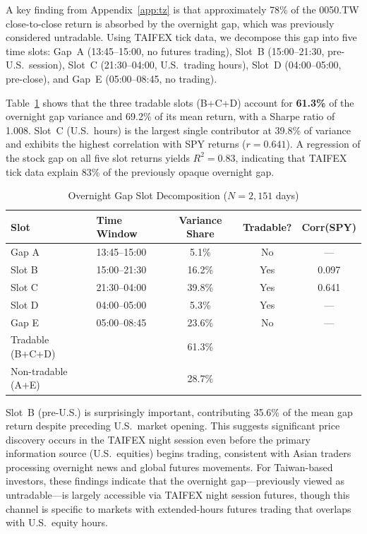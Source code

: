 A key finding from Appendix~\ref{app:tz} is that approximately 78\% of the 0050.TW close-to-close return is absorbed by the overnight gap, which was previously considered untradable. Using TAIFEX tick data, we decompose this gap into five time slots: Gap~A (13:45--15:00, no futures trading), Slot~B (15:00--21:30, pre-U.S.\ session), Slot~C (21:30--04:00, U.S.\ trading hours), Slot~D (04:00--05:00, pre-close), and Gap~E (05:00--08:45, no trading).

Table~\ref{tab:gap_decomp} shows that the three tradable slots (B+C+D) account for \textbf{61.3\%} of the overnight gap variance and 69.2\% of its mean return, with a Sharpe ratio of 1.008. Slot~C (U.S.\ hours) is the largest single contributor at 39.8\% of variance and exhibits the highest correlation with SPY returns ($r = 0.641$). A regression of the stock gap on all five slot returns yields $R^2 = 0.83$, indicating that TAIFEX tick data explain 83\% of the previously opaque overnight gap.

\begin{table}[H]
\centering
\caption{Overnight Gap Slot Decomposition ($N = 2{,}151$ days)}
\label{tab:gap_decomp}
\begin{tabular}{llccc}
\toprule
Slot & Time Window & Variance Share & Tradable? & Corr(SPY) \\
\midrule
Gap A & 13:45--15:00 & 5.1\% & No & --- \\
Slot B & 15:00--21:30 & 16.2\% & Yes & 0.097 \\
Slot C & 21:30--04:00 & 39.8\% & Yes & 0.641 \\
Slot D & 04:00--05:00 & 5.3\% & Yes & --- \\
Gap E & 05:00--08:45 & 23.6\% & No & --- \\
\midrule
Tradable (B+C+D) & & 61.3\% & & \\
Non-tradable (A+E) & & 28.7\% & & \\
\bottomrule
\end{tabular}
\end{table}

Slot~B (pre-U.S.) is surprisingly important, contributing 35.6\% of the mean gap return despite preceding U.S.\ market opening. This suggests significant price discovery occurs in the TAIFEX night session even before the primary information source (U.S.\ equities) begins trading, consistent with Asian traders processing overnight news and global futures movements. For Taiwan-based investors, these findings indicate that the overnight gap---previously viewed as untradable---is largely accessible via TAIFEX night session futures, though this channel is specific to markets with extended-hours futures trading that overlaps with U.S.\ equity hours.



